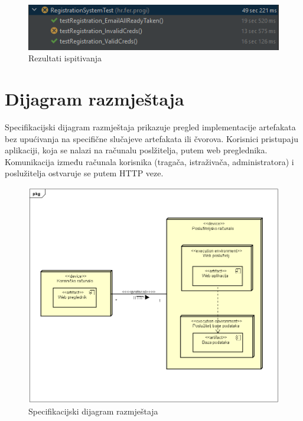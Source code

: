			\begin{figure}[H]
				\includegraphics[scale=1]{slike/registrationTests.png} 
				\centering
				\caption{Rezultati ispitivanja}
				\label{fig:promjene}
			\end{figure}
			
			\eject 
		
		
		\section{Dijagram razmještaja}
		
			 Specifikacijski dijagram razmještaja prikazuje pregled implementacije artefakata bez upućivanja na specifične slučajeve artefakata ili čvorova. Korisnici pristupaju aplikaciji, koja se nalazi na računalu poslžitelja, putem web preglednika. Komunikacija između računala korisnika (tragača, istraživača, administratora) i poslužitelja ostvaruje se putem HTTP veze.
			 
			 \begin{figure}[H]
			 	\includegraphics[scale=0.8]{dijagrami/SpecDijRaz.png} 
			 	\centering
			 	\caption{Specifikacijski dijagram razmještaja}
			 	\label{fig:Specifikacijski dijagram razmještaja}
			 \end{figure}
			
